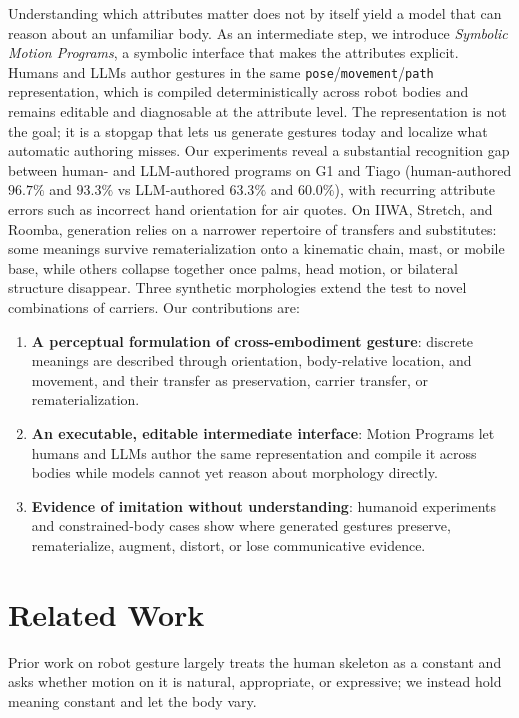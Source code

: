 \documentclass[letterpaper,10pt,conference]{ieeeconf}
\newcommand{\methodfull}{Symbolic Motion Program}
\begin{document}
Understanding which attributes matter does not by itself yield a model that can reason about an unfamiliar body. As an intermediate step, we introduce \textit{\methodfull{}s}, a symbolic interface that makes the attributes explicit. Humans and LLMs author gestures in the same \texttt{pose}/\texttt{movement}/\texttt{path} representation, which is compiled deterministically across robot bodies and remains editable and diagnosable at the attribute level. The representation is not the goal; it is a stopgap that lets us generate gestures today and localize what automatic authoring misses. Our experiments reveal a substantial recognition gap between human- and LLM-authored programs on G1 and Tiago (human-authored $96.7\%$ and $93.3\%$ vs LLM-authored $63.3\%$ and $60.0\%$), with recurring attribute errors such as incorrect hand orientation for air quotes. On IIWA, Stretch, and Roomba, generation relies on a narrower repertoire of transfers and substitutes: some meanings survive rematerialization onto a kinematic chain, mast, or mobile base, while others collapse together once palms, head motion, or bilateral structure disappear. Three synthetic morphologies extend the test to novel combinations of carriers. Our contributions are:
\begin{enumerate}
\setlength{\itemsep}{0.1em}
\item \textbf{A perceptual formulation of cross-embodiment gesture}: discrete meanings are described through orientation, body-relative location, and movement, and their transfer as preservation, carrier transfer, or rematerialization.
\item \textbf{An executable, editable intermediate interface}: Motion Programs let humans and LLMs author the same representation and compile it across bodies while models cannot yet reason about morphology directly.
\item \textbf{Evidence of imitation without understanding}: humanoid experiments and constrained-body cases show where generated gestures preserve, rematerialize, augment, distort, or lose communicative evidence.
\end{enumerate}

\section{Related Work}
Prior work on robot gesture largely treats the human skeleton as a constant and asks whether motion on it is natural, appropriate, or expressive; we instead hold meaning constant and let the body vary.
\end{document}
